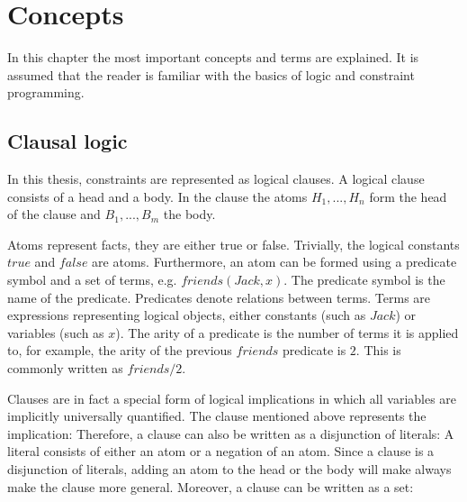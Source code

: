 \chapter{Concepts}
\label{cha:bg}

In this chapter the most important concepts and terms are explained. It is assumed that the reader is familiar with the basics of logic and constraint programming.

\section{Clausal logic}
\label{sec:clausal_logic}
In this thesis, constraints are represented as logical clauses. A logical clause consists of a head and a body. In the clause the atoms $H_1, ..., H_n$ form the head of the clause and $B_1, ..., B_m$ the body. 

Atoms represent facts, they are either true or false. Trivially, the logical constants $true$ and $false$ are atoms. Furthermore, an atom can be formed using a predicate symbol and a set of terms, e.g. $friends(Jack, x)$. The predicate symbol is the name of the predicate. Predicates denote relations between terms. Terms are expressions representing logical objects, either constants (such as $Jack$) or variables (such as $x$). The arity of a predicate is the number of terms it is applied to, for example, the arity of the previous $friends$ predicate is $2$.
This is commonly written as $\mathit{friends}/2$.

Clauses are in fact a special form of logical implications in which all variables are implicitly universally quantified. The clause mentioned above represents the implication:  Therefore, a clause can also be written as a disjunction of literals:  A literal consists of either an atom or a negation of an atom. Since a clause is a disjunction of literals, adding an atom to the head or the body will make always make the clause more general. Moreover, a clause can be written as a set: 

